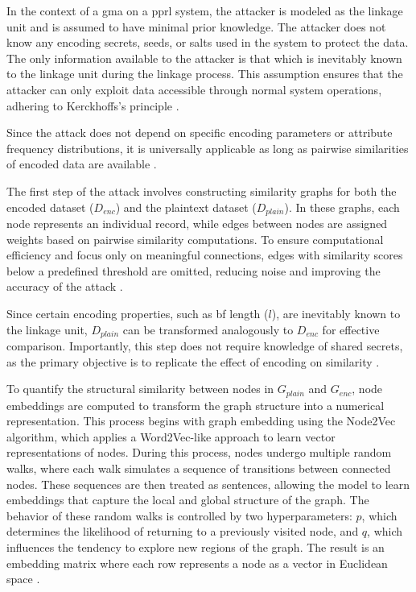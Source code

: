 In the context of a \ac{gma} on a \ac{pprl} system, the attacker is modeled as the linkage unit and is assumed to have minimal prior knowledge.
The attacker does not know any encoding secrets, seeds, or salts used in the system to protect the data.
The only information available to the attacker is that which is inevitably known to the linkage unit during the linkage process.
This assumption ensures that the attacker can only exploit data accessible through normal system operations, adhering to Kerckhoffs's principle \cite{schaefer2024}.

Since the attack does not depend on specific encoding parameters or attribute frequency distributions, it is universally applicable as long as pairwise similarities of encoded data are available \cite{schaefer2024}.

The first step of the attack involves constructing similarity graphs for both the encoded dataset (\(D_{enc}\)) and the plaintext dataset (\(D_{plain}\)).
In these graphs, each node represents an individual record, while edges between nodes are assigned weights based on pairwise similarity computations.
To ensure computational efficiency and focus only on meaningful connections, edges with similarity scores below a predefined threshold are omitted, reducing noise and improving the accuracy of the attack \cite{schaefer2024}.

Since certain encoding properties, such as \ac{bf} length ($l$), are inevitably known to the linkage unit, $D_{plain}$ can be transformed analogously to $D_{enc}$ for effective comparison.
Importantly, this step does not require knowledge of shared secrets, as the primary objective is to replicate the effect of encoding on similarity \cite{schaefer2024}.

To quantify the structural similarity between nodes in \(G_{plain}\) and \(G_{enc}\), node embeddings are computed to transform the graph structure into a numerical representation.
This process begins with graph embedding using the Node2Vec algorithm, which applies a Word2Vec-like approach to learn vector representations of nodes.
During this process, nodes undergo multiple random walks, where each walk simulates a sequence of transitions between connected nodes.
These sequences are then treated as sentences, allowing the model to learn embeddings that capture the local and global structure of the graph.
The behavior of these random walks is controlled by two hyperparameters: \(p\), which determines the likelihood of returning to a previously visited node, and \(q\), which influences the tendency to explore new regions of the graph.
The result is an embedding matrix where each row represents a node as a vector in Euclidean space \cite{schaefer2024}.

